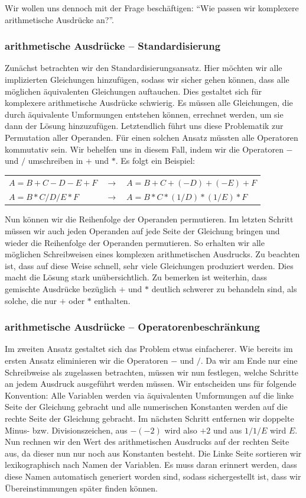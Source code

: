 Wir wollen uns dennoch mit der Frage beschäftigen: ``Wie passen wir komplexere arithmetische Ausdrücke an?''. 

\subsubsection{arithmetische Ausdrücke -- Standardisierung}

Zunächst betrachten wir den Standardisierungsansatz. Hier möchten wir alle implizierten Gleichungen hinzufügen, sodass wir sicher gehen können, dass alle möglichen äquivalenten Gleichungen auftauchen. Dies gestaltet sich für komplexere arithmetische Ausdrücke schwierig. Es müssen alle Gleichungen, die durch äquivalente Umformungen entstehen können, errechnet werden, um sie dann der Lösung hinzuzufügen. Letztendlich führt uns diese Problematik zur Permutation aller Operanden. Für einen solchen Ansatz müssten alle Operatoren kommutativ sein. Wir behelfen uns in diesem Fall, indem wir die Operatoren $-$ und $/$ umschreiben in $+$ und $*$. Es folgt ein Beispiel:

\begin{tabular}{lll}
$A=B+C-D-E+F$ & $\to$ & $A=B+C+(-D)+(-E)+F$\\
$A=B*C/D/E*F$ & $\to$ & $A=B*C*(1/D)*(1/E)*F$\\
\end{tabular}

Nun können wir die Reihenfolge der Operanden permutieren. Im letzten Schritt müssen wir auch jeden Operanden auf jede Seite der Gleichung bringen und wieder die Reihenfolge der Operanden permutieren. So erhalten wir alle möglichen Schreibweisen eines komplexen arithmetischen Ausdrucks. Zu beachten ist, dass auf diese Weise schnell, sehr viele Gleichungen produziert werden. Dies macht die Lösung stark unübersichtlich. Zu bemerken ist weiterhin, dass gemischte Ausdrücke bezüglich $+$ und $*$ deutlich schwerer zu behandeln sind, als solche, die nur $+$ oder $*$ enthalten.

\subsubsection{arithmetische Ausdrücke -- Operatorenbeschränkung}

Im zweiten Ansatz gestaltet sich das Problem etwas einfacherer. Wie bereits im ersten Ansatz eliminieren wir die Operatoren $-$ und $/$. Da wir am Ende nur eine Schreibweise als zugelassen betrachten, müssen wir nun festlegen, welche Schritte an jedem Ausdruck ausgeführt werden müssen. Wir entscheiden uns für folgende Konvention: Alle Variablen werden via äquivalenten Umformungen auf die linke Seite der Gleichung gebracht und alle numerischen Konstanten werden auf die rechte Seite der Gleichung gebracht. Im nächsten Schritt entfernen wir doppelte Minus- bzw. Divisionszeichen, aus $-(-2)$ wird also $+2$ und aus $1/1/E$ wird $E$. Nun rechnen wir den Wert des arithmetischen Ausdrucks auf der rechten Seite aus, da dieser nun nur noch aus Konstanten besteht. Die Linke Seite sortieren wir lexikographisch nach Namen der Variablen. Es muss daran erinnert werden, dass diese Namen automatisch generiert worden sind, sodass sichergestellt ist, dass wir Übereinstimmungen später finden können.

